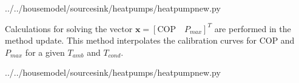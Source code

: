  
{../../housemodel/sourcesink/heatpumps/heatpumpnew.py}

Calculations for solving the vector $\mathbf{x} = [\text{COP} \quad P_{max}]^T$ are performed in the method \textsf{update}. This method interpolates the calibration curves for COP and $P_{max}$ for a given $T_{amb}$ and $T_{cond}$. 


{../../housemodel/sourcesink/heatpumps/heatpumpnew.py}

\newpage
